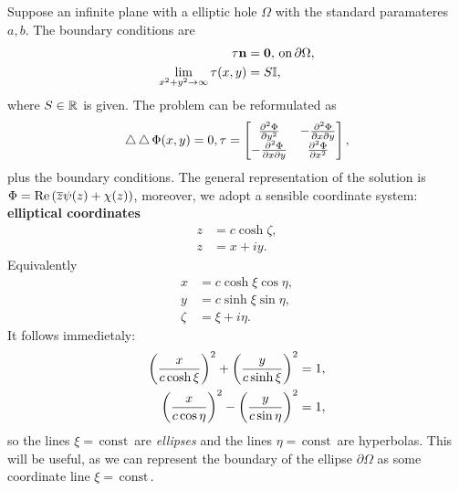 \documentclass[reqno, a4paper]{article}
\begin{document}
Suppose an infinite plane with a elliptic hole $\Omega$ with the standard paramateres $a,b$. The boundary conditions are
\begin{align*}
	\mathbb{\tau} \vb{n} &= \vb{0}, \, \text{on} \, \partial \Omega,\\
	\lim_{x^{2}+y^{2}\to \infty}\mathbb{\tau}\qty(x,y) &= S \mathbb{I},
\end{align*}
where $S \in {\mathbb R}$ is given. The problem can be reformulated as
\begin{equation}
	\operatorname{\bigtriangleup} \operatorname{\bigtriangleup} \Phi\qty(x,y) = 0, \mathbb{\tau} = \begin{bmatrix}
		\pdv[2]{\Phi}{y} & -\pdv[2]{\Phi}{x}{y} \\
		- \pdv[2]{\Phi}{x}{y} & \pdv[2]{\Phi}{x}
	\end{bmatrix},
\end{equation}
plus the boundary conditions. The general representation of the solution is $ \Phi = \Re\qty(\overline{z}\psi(z)+\chi(z))$, moreover, we adopt a sensible coordinate system: \textbf{elliptical coordinates}
\begin{align*}
	z &= c \cosh \zeta,\\
	z &= x + i y.
\end{align*}
Equivalently
\begin{align*}
	x &= c \cosh \xi \cos \eta, \\
	y &= c \sinh \xi \sin \eta, \\
	\zeta &= \xi + i \eta.
\end{align*}
It follows immedietaly:
\begin{align*}
	\qty(\frac{x}{c\cosh \xi})^{2} + \qty(\frac{y}{c\sinh \xi})^{2} &= 1, \\ 
	\qty(\frac{x}{c\cos \eta})^{2}-\qty(\frac{y}{c \sin \eta})^{2} &= 1,
\end{align*}
so the lines $\xi = \, \text{const} \,$ are \textit{ellipses} and the lines $\eta = \, \text{const} \,$ are hyperbolas. This will be useful, as we can represent the boundary of the ellipse $\partial \Omega$ as some coordinate line $\xi = \, \text{const} \,.$
\end{document}
